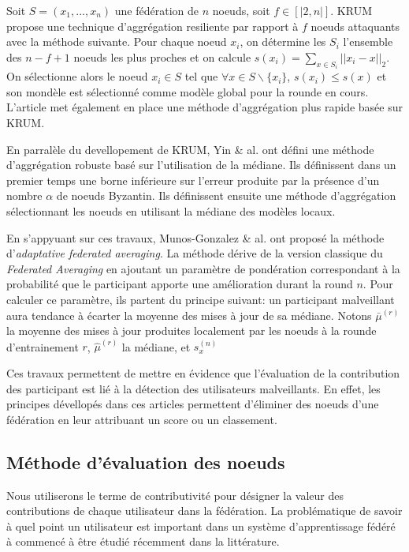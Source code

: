 \documentclass[stage3a]{tnreport} %
\begin{document}
Soit $S=(x_1,...,x_n)$ une fédération de $n$ noeuds, soit $f\in[|2,n|]$. KRUM propose une technique d'aggrégation resiliente par rapport à $f$ noeuds attaquants avec la méthode suivante. Pour chaque noeud $x_i$, on détermine les $S_i$ l'ensemble des $n-f+1$ noeuds les plus proches et on calcule $s(x_i)=\sum_{x\in S_i} ||x_i - x||_2$. On sélectionne alors le noeud $x_i \in S$ tel que $\forall x \in S \backslash\{x_i\}$, $s(x_i) \leq s(x)$ et son mondèle est sélectionné comme modèle global pour la rounde en cours. L'article met également en place une méthode d'aggrégation plus rapide basée sur KRUM.

En parralèle du devellopement de KRUM, Yin \& al. ont défini une méthode d'aggrégation robuste basé sur l'utilisation de la médiane. Ils définissent dans un premier temps une borne inférieure sur l'erreur produite par la présence d'un nombre $\alpha$ de noeuds Byzantin. Ils définissent ensuite une méthode d'aggrégation sélectionnant les noeuds en utilisant la médiane des modèles locaux.

En s'appyuant sur ces travaux, Munos-Gonzalez \& al. ont proposé la méthode d'\textit{adaptative federated averaging}. La méthode dérive de la version classique du \textit{Federated Averaging} en ajoutant un paramètre de pondération correspondant à la probabilité que le participant apporte une amélioration durant la round $n$. Pour calculer ce paramètre, ils partent du principe suivant: un participant malveillant aura tendance à écarter la moyenne des mises à jour de sa médiane. Notons $\bar\mu^{(r)}$ la moyenne des mises à jour produites localement par les noeuds à la rounde d'entrainement $r$, $\hat{\mu}^{(r)}$ la médiane, et $s_x^{(n)}$ 

Ces travaux permettent de mettre en évidence que l'évaluation de la contribution des participant est lié à la détection des utilisateurs malveillants. En effet, les principes dévellopés dans ces articles permettent d'éliminer des noeuds d'une fédération en leur attribuant un score ou un classement. 

\subsection{Méthode d'évaluation des noeuds}


Nous utiliserons le terme de contributivité pour désigner la valeur des contributions de chaque utilisateur dans la fédération. La problématique de savoir à quel point un utilisateur est important dans un système d'apprentissage fédéré à commencé à être étudié récemment dans la littérature.
\end{document}
